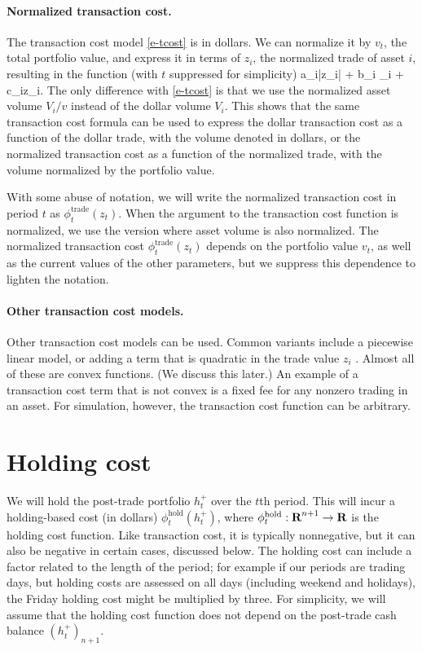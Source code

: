 \documentclass[openany]{article}  %
\newcommand{\trcost}{\phi^\mathrm{trade}}
\newcommand{\hldcost}{\phi^\mathrm{hold}}
\begin{document}
\paragraph{Normalized transaction cost.}
The transaction cost model \eqref{e-tcost} is in dollars.
We can normalize it by $v_t$, the total portfolio value, and
express it in terms of $z_i$, the normalized trade of asset $i$,
resulting in the function (with $t$ suppressed for simplicity)
\BEQ\label{e-tcost-weights}
a_i|z_i| + b_i \sigma_i  + c_iz_i.
\EEQ
The only difference with \eqref{e-tcost} is that we use
the normalized asset volume $V_i/v$ instead of the dollar volume $V_i$.
This shows that the same transaction cost formula can be used to express
the dollar transaction cost as a function of the dollar trade, with
the volume denoted in dollars,
or the normalized transaction cost as a function of the normalized
trade, with the volume normalized by the portfolio value.

With some abuse of notation, we will write the normalized transaction cost
in period $t$ as $\trcost_t(z_t)$.  When the argument to the transaction cost
function is normalized, we use the version where asset volume is also normalized.
The normalized transaction cost $\trcost_t(z_t)$ depends on the portfolio value
$v_t$, as well as the current values of the other parameters,
but we suppress this dependence to lighten the notation.

\paragraph{Other transaction cost models.}
Other transaction cost models can be used.  Common variants include
a piecewise linear model, or adding a term that is quadratic in the trade value $z_i$
\cite{almgren2001optimal,grinold2006dynamic,garleanu2013dynamic}.
Almost all of these are convex functions. (We discuss this later.)
An example of a transaction cost term that is not convex is
a fixed fee for any nonzero trading in an asset.
For simulation, however, the transaction cost function can be arbitrary.

\section{Holding cost}
We will hold the post-trade portfolio $h_t^+$ over the $t$th period.
This will incur a holding-based cost (in dollars) $\hldcost_t(h_t^+)$,
where $\hldcost_t:\reals^{n+1} \to \reals$ is the holding cost function.
Like transaction cost, it is typically nonnegative, but it can also be
negative in certain cases, discussed below.
The holding cost can include a factor related to the length of the period;
for example if our periods are trading days, but holding costs are assessed on
all days (including weekend and holidays), the Friday holding cost might be
multiplied by three.
For simplicity, we will assume that the holding cost function
does not depend on the post-trade cash balance $(h_t^+)_{n+1}$.
\end{document}
